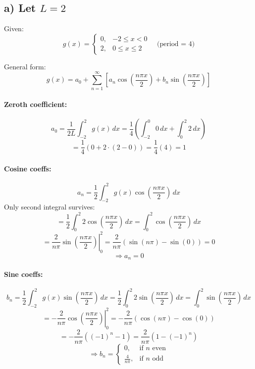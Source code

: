 \documentclass{article}
\begin{document}
\subsection*{a) Let $L = 2$}

Given:
\[
g(x) =
\begin{cases}
0, & -2 \le x < 0 \\
2, & 0 \le x \le 2
\end{cases}
\quad \text{(period = 4)}
\]

General form:
\[
g(x) = a_0 + \sum_{n=1}^\infty \left[ a_n \cos\left( \frac{n\pi x}{2} \right) + b_n \sin\left( \frac{n\pi x}{2} \right) \right]
\]

\paragraph{Zeroth coefficient:}
\[
a_0 = \frac{1}{2L} \int_{-2}^{2} g(x)\,dx = \frac{1}{4} \left( \int_{-2}^{0} 0\,dx + \int_0^2 2\,dx \right)
\]
\[
= \frac{1}{4} (0 + 2 \cdot (2 - 0)) = \frac{1}{4}(4) = 1
\]

\paragraph{Cosine coeffs:}
\[
a_n = \frac{1}{2} \int_{-2}^{2} g(x) \cos\left( \frac{n\pi x}{2} \right)\,dx
\]
Only second integral survives:
\[
= \frac{1}{2} \int_0^2 2 \cos\left( \frac{n\pi x}{2} \right)\,dx = \int_0^2 \cos\left( \frac{n\pi x}{2} \right)\,dx
\]
\[
= \left. \frac{2}{n\pi} \sin\left( \frac{n\pi x}{2} \right) \right|_0^2 = \frac{2}{n\pi} ( \sin(n\pi) - \sin(0) ) = 0
\]
\[
\Rightarrow a_n = 0
\]

\paragraph{Sine coeffs:}
\[
b_n = \frac{1}{2} \int_{-2}^{2} g(x) \sin\left( \frac{n\pi x}{2} \right)\,dx
= \frac{1}{2} \int_0^2 2 \sin\left( \frac{n\pi x}{2} \right)\,dx
= \int_0^2 \sin\left( \frac{n\pi x}{2} \right)\,dx
\]
\[
= \left. -\frac{2}{n\pi} \cos\left( \frac{n\pi x}{2} \right) \right|_0^2
= -\frac{2}{n\pi} \left( \cos(n\pi) - \cos(0) \right)
\]
\[
= -\frac{2}{n\pi} \left( (-1)^n - 1 \right) = \frac{2}{n\pi} (1 - (-1)^n)
\]
\[
\Rightarrow b_n =
\begin{cases}
0, & \text{if } n \text{ even} \\
\frac{4}{n\pi}, & \text{if } n \text{ odd}
\end{cases}
\]
\end{document}
